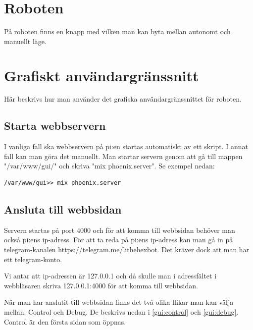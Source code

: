 \documentclass[a4paper,titlepage,12pt]{article}
\begin{document}
	\section{Roboten}
    På roboten finns en knapp med vilken man kan byta mellan autonomt och
    manuellt läge.

	

	\section{Grafiskt användargränssnitt}
	Här beskrivs hur man använder det grafiska användargränssnittet för roboten.
	
	\subsection{Starta webbservern}
    I vanliga fall ska webbservern på pi:en startas automatiskt av ett skript.
    I annat fall kan man göra det manuellt.
	Man startar servern genom att gå till mappen "/var/www/gui/" och skriva "mix
    phoenix.server". Se exempel nedan:
	
	\begin{lstlisting}[style=linux]
	/var/www/gui>> mix phoenix.server
	\end{lstlisting}
	
	\subsection{Ansluta till webbsidan}
	Servern startas på port 4000 och för att komma till webbsidan behöver man
    också pi:ens ip-adress. För att ta reda på pi:ens ip-adress kan man gå in
    på telegram-kanalen https://telegram.me/lithehexbot. Det kräver dock att
    man har ett telegram-konto.
	
	Vi antar att ip-adressen är 127.0.0.1 och då skulle man i adressfältet i
    webbläsaren skriva 127.0.0.1:4000 för att komma till webbsidan.
	
	När man har anslutit till webbsidan finns det två olika flikar man kan välja
    mellan: Control och Debug. De beskrivs nedan i \ref{gui:control} och
    \ref{gui:debug}. Control är den första sidan som öppnas.
    \newpage
	
\end{document}
